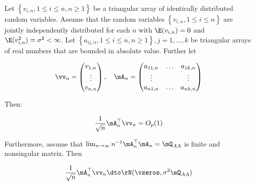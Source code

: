 \documentclass[english,12pt]{book}\usepackage[]{graphicx}\usepackage[]{xcolor}
\begin{document}
\begin{theorem}\label{teo:CLT_tri_arr}
Let $\left\lbrace v_{i,n}, 1 \leq i \leq n, n\geq 1\right\rbrace $ be a triangular array of identically distributed random variables. Assume that the random variables $\left\lbrace v_{i,n}, 1 \leq i \leq n\right\rbrace$ are jointly independently distributed for each $n$ with $\E(v_{i,n})= 0$ and $\E(v_{i,n}^2) = \sigma^2 < \infty$. Let $\left\lbrace a_{ij,n}, 1 \leq i \leq n, n\geq 1\right\rbrace, j = 1,...,k$ be triangular arrays of real numbers that are bounded in absolute value. Further let

\begin{equation*}
  \vv_n = \begin{pmatrix}
            v_{1, n} \\
            \vdots \\
            v_{n,n}
          \end{pmatrix}, \quad
          \mA_n = \begin{pmatrix}
            a_{11,n} & \hdots & a_{1k, n} \\
            \vdots &         & \vdots \\
            a_{n1,n} & \hdots & a_{nk, n}
          \end{pmatrix}
\end{equation*}

Then:

\begin{equation*}
\frac{1}{\sqrt{n}}\mA_n^\top\vv_n = O_p(1)
\end{equation*}

Furthermore, assume that $\lim_{n\to\infty}n^{-1}\mA^\top_n\mA_n = \mQ_{AA}$ is finite and nonsingular matrix. Then

\begin{equation*}
\frac{1}{\sqrt{n}}\mA_n^\top\vv_n \dto \rN(\vzeros, \sigma^2 \mQ_{AA})
\end{equation*}
\end{theorem}
\end{document}
